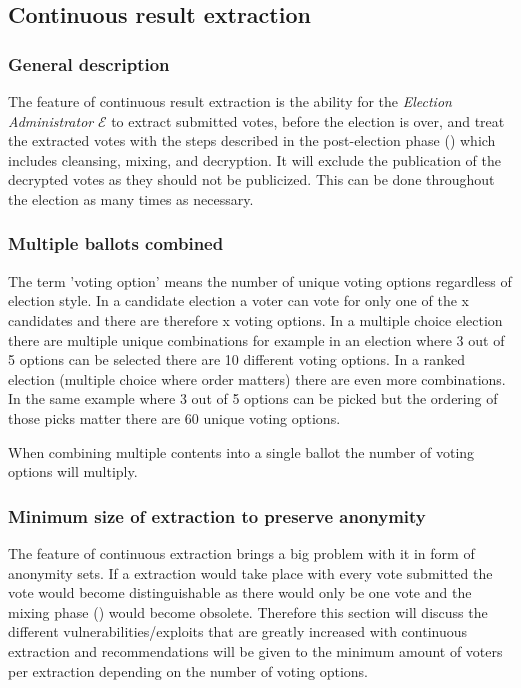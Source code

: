 \subsection{Continuous result extraction} \label{app: continuous result extraction}


\subsubsection{General description}
The feature of continuous result extraction is the ability for the \textit{Election Administrator} $\mathcal{E}$ to extract submitted votes, before the election is over, and treat the extracted votes with the steps described in the post-election phase () which includes cleansing, mixing, and decryption. It will exclude the publication of the decrypted votes as they should not be publicized. This can be done throughout the election as many times as necessary. 


\subsubsection{Multiple ballots combined}
The term 'voting option' means the number of unique voting options regardless of election style. In a candidate election a voter can vote for only one of the x candidates and there are therefore x voting options. In a multiple choice election there are multiple unique combinations for example in an election where 3 out of 5 options can be selected there are 10 different voting options. In a ranked election (multiple choice where order matters) there are even more combinations. In the same example where 3 out of 5 options can be picked but the ordering of those picks matter there are 60 unique voting options.

When combining multiple contents into a single ballot the number of voting options will multiply. 


\subsubsection{Minimum size of extraction to preserve anonymity}
The feature of continuous extraction brings a big problem with it in form of anonymity sets. If a extraction would take place with every vote submitted the vote would become distinguishable as there would only be one vote and the mixing phase () would become obsolete. Therefore this section will discuss the different vulnerabilities/exploits that are greatly increased with continuous extraction and recommendations will be given to the minimum amount of voters per extraction depending on the number of voting options. 

